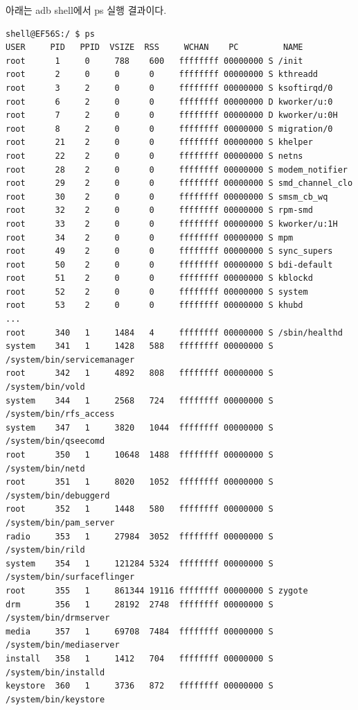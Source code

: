 아래는 adb shell에서 ps 실행 결과이다.\\
\begin{lstlisting}[frame=single] 
shell@EF56S:/ $ ps
USER     PID   PPID  VSIZE  RSS     WCHAN    PC         NAME
root      1     0     788    600   ffffffff 00000000 S /init
root      2     0     0      0     ffffffff 00000000 S kthreadd
root      3     2     0      0     ffffffff 00000000 S ksoftirqd/0
root      6     2     0      0     ffffffff 00000000 D kworker/u:0
root      7     2     0      0     ffffffff 00000000 D kworker/u:0H
root      8     2     0      0     ffffffff 00000000 S migration/0
root      21    2     0      0     ffffffff 00000000 S khelper
root      22    2     0      0     ffffffff 00000000 S netns
root      28    2     0      0     ffffffff 00000000 S modem_notifier
root      29    2     0      0     ffffffff 00000000 S smd_channel_clo
root      30    2     0      0     ffffffff 00000000 S smsm_cb_wq
root      32    2     0      0     ffffffff 00000000 S rpm-smd
root      33    2     0      0     ffffffff 00000000 S kworker/u:1H
root      34    2     0      0     ffffffff 00000000 S mpm
root      49    2     0      0     ffffffff 00000000 S sync_supers
root      50    2     0      0     ffffffff 00000000 S bdi-default
root      51    2     0      0     ffffffff 00000000 S kblockd
root      52    2     0      0     ffffffff 00000000 S system
root      53    2     0      0     ffffffff 00000000 S khubd
...
root      340   1     1484   4     ffffffff 00000000 S /sbin/healthd
system    341   1     1428   588   ffffffff 00000000 S /system/bin/servicemanager
root      342   1     4892   808   ffffffff 00000000 S /system/bin/vold
system    344   1     2568   724   ffffffff 00000000 S /system/bin/rfs_access
system    347   1     3820   1044  ffffffff 00000000 S /system/bin/qseecomd
root      350   1     10648  1488  ffffffff 00000000 S /system/bin/netd
root      351   1     8020   1052  ffffffff 00000000 S /system/bin/debuggerd
root      352   1     1448   580   ffffffff 00000000 S /system/bin/pam_server
radio     353   1     27984  3052  ffffffff 00000000 S /system/bin/rild
system    354   1     121284 5324  ffffffff 00000000 S /system/bin/surfaceflinger
root      355   1     861344 19116 ffffffff 00000000 S zygote
drm       356   1     28192  2748  ffffffff 00000000 S /system/bin/drmserver
media     357   1     69708  7484  ffffffff 00000000 S /system/bin/mediaserver
install   358   1     1412   704   ffffffff 00000000 S /system/bin/installd
keystore  360   1     3736   872   ffffffff 00000000 S /system/bin/keystore

\end{lstlisting}
